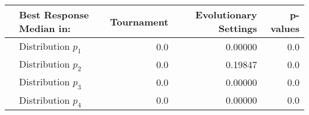 \begin{tabular}{llrrr}
\toprule
{} & Best Response Median in: &  Tournament &  Evolutionary Settings &  p-values \\
\midrule
&       Distribution $p_1$ &         0.0 &                0.00000 &       0.0 \\
&       Distribution $p_2$ &         0.0 &                0.19847 &       0.0 \\
&       Distribution $p_3$ &         0.0 &                0.00000 &       0.0 \\
&       Distribution $p_4$ &         0.0 &                0.00000 &       0.0 \\
\bottomrule
\end{tabular}
